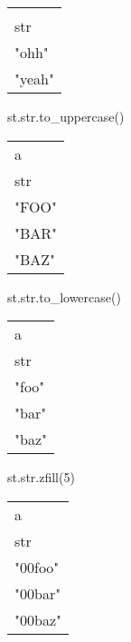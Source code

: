 \documentclass[
  letterpaper,
  DIV=11,
  numbers=noendperiod]{scrartcl}
\newenvironment{Shaded}{\begin{snugshade}}{\end{snugshade}}
\newcommand{\BuiltInTok}[1]{\textcolor[rgb]{0.00,0.23,0.31}{#1}}
\newcommand{\DecValTok}[1]{\textcolor[rgb]{0.68,0.00,0.00}{#1}}
\newcommand{\NormalTok}[1]{\textcolor[rgb]{0.00,0.23,0.31}{#1}}
\begin{document}
\begin{longtable}[]{@{}l@{}}
\toprule()
 \\
str \\
\midrule()
\endhead
"ohh" \\
"yeah" \\
\bottomrule()
\end{longtable}

\begin{Shaded}
\begin{Highlighting}[]
\NormalTok{st.}\BuiltInTok{str}\NormalTok{.to\_uppercase()}
\end{Highlighting}
\end{Shaded}

\begin{longtable}[]{@{}l@{}}
\toprule()
a \\
str \\
\midrule()
\endhead
"FOO" \\
"BAR" \\
"BAZ" \\
\bottomrule()
\end{longtable}

\begin{Shaded}
\begin{Highlighting}[]
\NormalTok{st.}\BuiltInTok{str}\NormalTok{.to\_lowercase()}
\end{Highlighting}
\end{Shaded}

\begin{longtable}[]{@{}l@{}}
\toprule()
a \\
str \\
\midrule()
\endhead
"foo" \\
"bar" \\
"baz" \\
\bottomrule()
\end{longtable}

\begin{Shaded}
\begin{Highlighting}[]
\NormalTok{st.}\BuiltInTok{str}\NormalTok{.zfill(}\DecValTok{5}\NormalTok{)}
\end{Highlighting}
\end{Shaded}

\begin{longtable}[]{@{}l@{}}
\toprule()
a \\
str \\
\midrule()
\endhead
"00foo" \\
"00bar" \\
"00baz" \\
\bottomrule()
\end{longtable}
\end{document}
